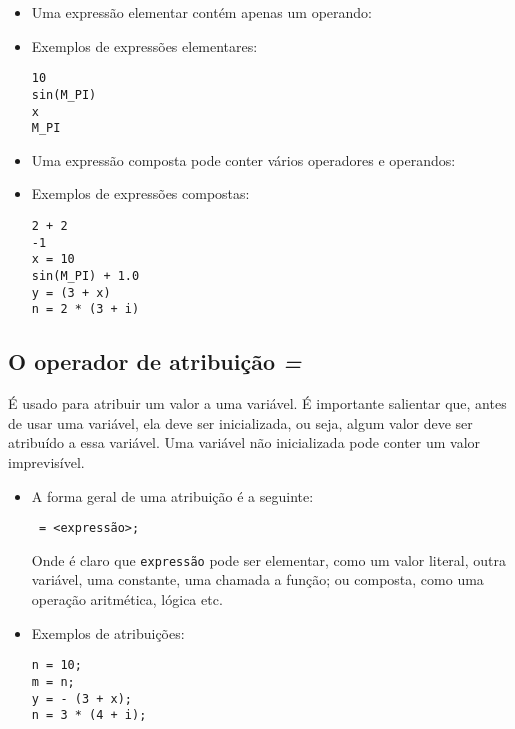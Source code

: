 \begin{itemize}
\item Uma expressão elementar contém apenas um operando:

\item Exemplos de expressões elementares:
\begin{lstlisting}
10
sin(M_PI)
x
M_PI
\end{lstlisting}

\item Uma expressão composta pode conter vários operadores e operandos:

\item Exemplos de expressões compostas:
\begin{lstlisting}
2 + 2
-1
x = 10
sin(M_PI) + 1.0
y = (3 + x)
n = 2 * (3 + i)
\end{lstlisting}


\end{itemize}

\subsection{O operador de atribuição \emph{=}}

É usado para atribuir um valor a uma variável. É importante salientar que, antes de usar uma variável, ela deve ser inicializada, ou seja, algum valor deve ser atribuído a essa variável. Uma variável não inicializada pode conter um valor imprevisível.

\begin{itemize}
\item A forma geral de uma atribuição é a seguinte:

{\tt <identificador da variável> = <expressão>;}

Onde é claro que {\tt expressão} pode ser elementar, como um valor literal, outra variável, uma constante, uma chamada a função; ou composta, como uma operação aritmética, lógica etc.

\item Exemplos de atribuições:
\begin{lstlisting}
n = 10;
m = n;
y = - (3 + x);
n = 3 * (4 + i);
\end{lstlisting}

\end{itemize}

